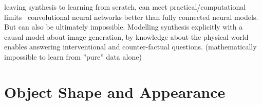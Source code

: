 	leaving synthesis to learning from scratch, can meet practical/computational limits \eg\ convolutional neural networks better than fully connected neural models.
	But can also be ultimately impossible. Modelling synthesis explicitly with a causal model about image generation, by knowledge about the physical world enables answering interventional and counter-factual questions. (mathematically impossible to learn from ''pure'' data alone)



\section{Object Shape and Appearance}
